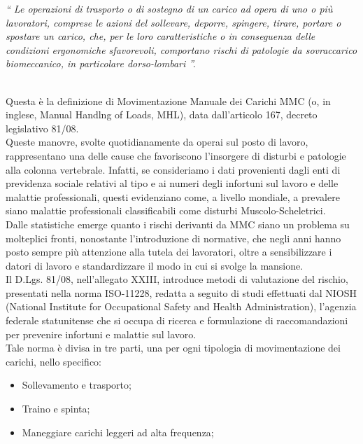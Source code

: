 \documentclass[a4paper, oneside]{book}
\begin{document}
\begin{addmargin}[1.5cm]{0cm}
\end{addmargin}
\begin{addmargin}{1.5cm}
\textit{“ Le operazioni di trasporto o di sostegno di un carico ad opera di uno o più
lavoratori, comprese le azioni del sollevare, deporre, spingere, tirare, portare o
spostare un carico, che, per le loro caratteristiche o in conseguenza delle
condizioni ergonomiche sfavorevoli, comportano rischi di patologie da
sovraccarico biomeccanico, in particolare dorso-lombari ”.} \\ \\
\end{addmargin}
Questa è la definizione di Movimentazione Manuale dei Carichi MMC (o, in inglese, Manual Handlng of Loads, MHL), data dall'articolo 167, decreto legislativo 81/08. \\ Queste manovre, svolte quotidianamente da operai sul posto di lavoro, rappresentano una delle cause che favoriscono l’insorgere di disturbi e patologie alla colonna vertebrale. Infatti, se consideriamo i dati provenienti dagli enti di previdenza sociale relativi al tipo e ai numeri degli infortuni sul lavoro e delle malattie professionali, questi evidenziano come, a livello mondiale, a prevalere siano malattie professionali classificabili come disturbi Muscolo-Scheletrici. \\
Dalle statistiche emerge quanto i rischi derivanti da MMC siano un problema su molteplici fronti, nonostante l'introduzione di normative, che negli anni hanno posto sempre più attenzione alla tutela dei lavoratori, oltre a sensibilizzare i datori di lavoro e standardizzare il modo in cui si svolge la mansione. \\
Il D.Lgs. 81/08, nell’allegato XXIII, introduce metodi di valutazione del rischio, presentati nella norma ISO-11228, redatta a seguito di studi effettuati dal NIOSH (National Institute for Occupational Safety and Health Administration), l’agenzia federale statunitense che si occupa di ricerca e formulazione di raccomandazioni per prevenire infortuni e malattie sul lavoro. \\
Tale norma è divisa in tre parti, una per ogni tipologia di movimentazione dei carichi, nello specifico:
\begin{itemize}
\item Sollevamento e trasporto;
\item Traino e spinta;
\item Maneggiare carichi leggeri ad alta frequenza;
\end{itemize}
\end{document}
